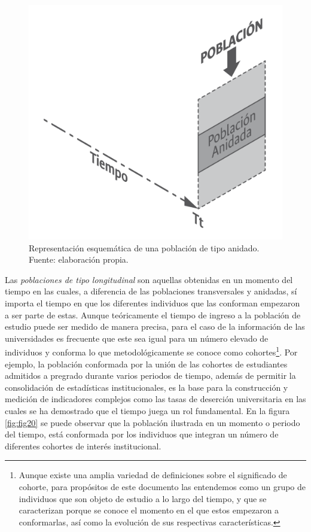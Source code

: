 \documentclass[
]{book}
\begin{document}
\begin{figure}

{\centering \includegraphics[width=0.75\linewidth]{imagenes/F_19} 

}

\caption{Representación esquemática de una población de tipo anidado. Fuente: elaboración propia.}\label{fig:fig19}
\end{figure}

Las \emph{poblaciones de tipo longitudinal} son aquellas obtenidas en un momento del tiempo en las cuales, a diferencia de las poblaciones transversales y anidadas, sí importa el tiempo en que los diferentes individuos que las conforman empezaron a ser parte de estas. Aunque teóricamente el tiempo de ingreso a la población de estudio puede ser medido de manera precisa, para el caso de la información de las universidades es frecuente que este sea igual para un número elevado de individuos y conforma lo que metodológicamente se conoce como cohortes\footnote{Aunque existe una amplia variedad de definiciones sobre el significado de cohorte, para propósitos de este documento las entendemos como un grupo de individuos que son objeto de estudio a lo largo del tiempo, y que se caracterizan porque se conoce el momento en el que estos empezaron a conformarlas, así como la evolución de sus respectivas características.}. Por ejemplo, la población conformada por la unión de las cohortes de estudiantes admitidos a pregrado durante varios periodos de tiempo, además de permitir la consolidación de estadísticas institucionales, es la base para la construcción y medición de indicadores complejos como las tasas de deserción universitaria en las cuales se ha demostrado que el tiempo juega un rol fundamental. En la figura \ref{fig:fig20} se puede observar que la población ilustrada en un momento o periodo del tiempo, está conformada por los individuos que integran un número de diferentes cohortes de interés institucional.
\end{document}
